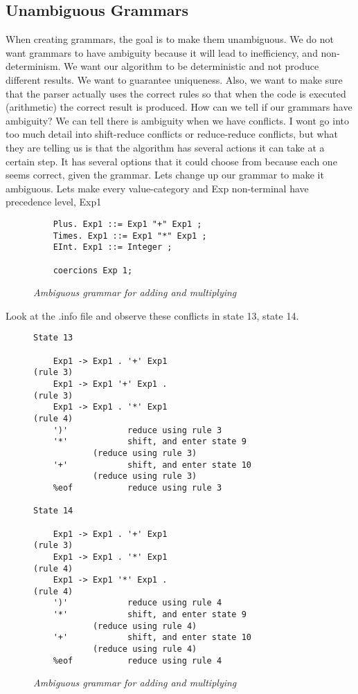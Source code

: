 \documentclass{article}
\begin{document}
\subsection{Unambiguous Grammars}

When creating grammars, the goal is to make them unambiguous. We do not want grammars to have ambiguity because it will lead to inefficiency, and non-determinism. We want our algorithm to be deterministic and not produce different results. We want to guarantee uniqueness. Also, we want to make sure that the parser actually uses the correct rules so that when the code is executed (arithmetic) the correct result is produced. How can we tell if our grammars have ambiguity? We can tell there is ambiguity when we have conflicts. I wont go into too much detail into shift-reduce conflicts or reduce-reduce conflicts, but what they are telling us is that the algorithm has several actions it can take at a certain step. It has several options that it could choose from because each one seems correct, given the grammar. Lets change up our grammar to make it ambiguous. Lets make every value-category and Exp non-terminal have precedence level, Exp1

\begin{figure}[H]
\begin{lstlisting}
    Plus. Exp1 ::= Exp1 "+" Exp1 ;
    Times. Exp1 ::= Exp1 "*" Exp1 ;
    EInt. Exp1 ::= Integer ;
    
    coercions Exp 1;

    \end{lstlisting}
    \caption{\textit{Ambiguous grammar for adding and multiplying}}
\end{figure}


Look at the .info file and observe these conflicts in state 13, state 14. 

\begin{figure}[H]
    \begin{lstlisting}
State 13

	Exp1 -> Exp1 . '+' Exp1                             (rule 3)
	Exp1 -> Exp1 '+' Exp1 .                             (rule 3)
	Exp1 -> Exp1 . '*' Exp1                             (rule 4)
	')'            reduce using rule 3
	'*'            shift, and enter state 9
			(reduce using rule 3)
	'+'            shift, and enter state 10
			(reduce using rule 3)
	%eof           reduce using rule 3

State 14

	Exp1 -> Exp1 . '+' Exp1                             (rule 3)
	Exp1 -> Exp1 . '*' Exp1                             (rule 4)
	Exp1 -> Exp1 '*' Exp1 .                             (rule 4)
	')'            reduce using rule 4
	'*'            shift, and enter state 9
			(reduce using rule 4)
	'+'            shift, and enter state 10
			(reduce using rule 4)
	%eof           reduce using rule 4
    \end{lstlisting}
    \caption{\textit{Ambiguous grammar for adding and multiplying}}
\end{figure}
\end{document}
